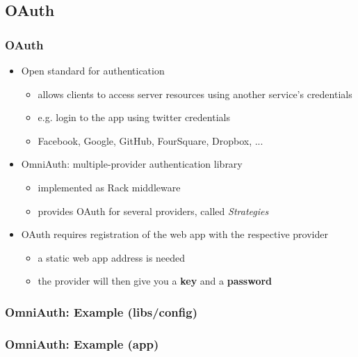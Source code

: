 \documentclass{beamer}
\begin{document}
\subsection{OAuth} 
\begin{frame}\frametitle{OAuth} 

  \begin{itemize}
    \item Open standard for authentication
    \begin{itemize}
      \item allows clients to access server resources using another service's credentials
      \item e.g. login to the app using twitter credentials
      \item Facebook, Google, GitHub, FourSquare, Dropbox, ...
    \end{itemize}
 
    \item OmniAuth: multiple-provider authentication library
    \begin{itemize}
      \item implemented as Rack middleware
      \item provides OAuth for several providers, called \textit{Strategies}
    \end{itemize}
    
    \item OAuth requires registration of the web app with the respective provider
    \begin{itemize}
      \item a static web app address is needed
      \item the provider will then give you a \textbf{key} and a \textbf{password} 
    \end{itemize}

  \end{itemize}

\end{frame}




\begin{frame}\frametitle{OmniAuth: Example (libs/config)} 

  

  
  
\end{frame}



\begin{frame}\frametitle{OmniAuth: Example (app)} 

  
  
\end{frame}
\end{document}
